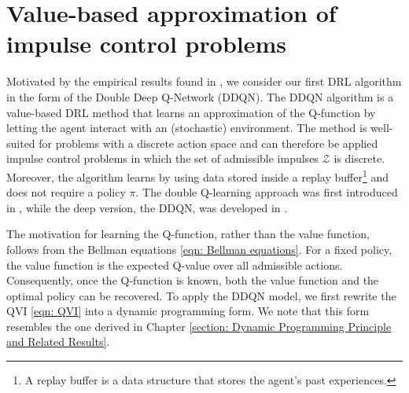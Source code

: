 \section{Value-based approximation of impulse control problems}
\label{section: Value-based Approximation of the Impulse-Control Problem}
Motivated by the empirical results found in \cite{anchuri2026rammstein}, we consider our first DRL algorithm in the form of the Double Deep Q-Network (DDQN). The DDQN algorithm is a value-based DRL method that learns an approximation of the Q-function by letting the agent interact with an (stochastic) environment. The method is well-suited for problems with a discrete action space and can therefore be applied impulse control problems in which the set of admissible impulses $\mathcal{Z}$ is discrete. Moreover, the algorithm learns by using data stored inside a replay buffer\footnote{A replay buffer is a data structure that stores the agent's past experiences.} and does not require a policy $\pi$. The double Q-learning approach was first introduced in \cite{hasselt2010double}, while the deep version, the DDQN, was developed in \cite{van2016deep}. 

The motivation for learning the Q‑function, rather than the value function, follows from the Bellman equations \eqref{eqn: Bellman equations}. For a fixed policy, the value function is the expected Q-value over all admissible actions. Consequently, once the Q‑function is known, both the value function and the optimal policy can be recovered. To apply the DDQN model, we first rewrite the QVI \eqref{eqn: QVI} into a dynamic programming form. We note that this form resembles the one derived in Chapter \ref{section: Dynamic Programming Principle and Related Results}.

